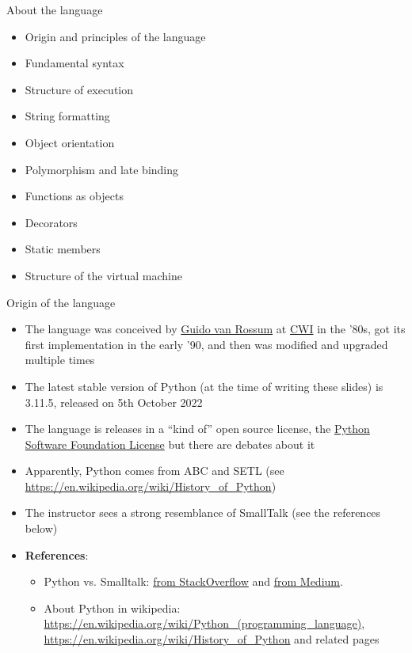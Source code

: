 \documentclass{beamer}
\begin{document}
\begin{frame}
{\centerline{About the language}}
\begin{itemize}
    \item Origin and principles of the language
    \item Fundamental syntax
    \item Structure of execution
    \item String formatting
    \item Object orientation
    \item Polymorphism and late binding
    \item Functions as objects
    \item Decorators
    \item Static members
    \item Structure of the virtual machine
\end{itemize} 
\end{frame}

\begin{frame}
{\centerline{Origin of the language}}
\begin{itemize}
    \item The language was conceived by  \href{https://en.wikipedia.org/wiki/Guido_van_Rossum}{Guido van Rossum} at  \href{https://en.wikipedia.org/wiki/Centrum_Wiskunde_\%26_Informatica}{CWI} in the '80s, got its first implementation in the early '90, and then was modified and upgraded multiple times
    \item The latest stable version of Python (at the time of writing these slides) is 3.11.5, released on 5th October 2022
    \item The language is releases in a ``kind of'' open source license, the \href{https://en.wikipedia.org/wiki/Python_Software_Foundation_License}{Python Software Foundation License} but there are debates about it
        \item Apparently, Python comes from ABC and SETL (see \url{https://en.wikipedia.org/wiki/History_of_Python})
    \item The instructor sees a strong resemblance of SmallTalk (see the references below)
\end{itemize} 

{\tiny
{}
\begin{itemize}
\item \textbf{References}:
\begin{itemize}
\item Python vs. Smalltalk: \href{https://stackoverflow.com/questions/1269242/differences-between-smalltalk-and-python}{from StackOverflow} and \href{https://medium.com/smalltalk-talk/why-choose-smalltalk-over-python-for-startups-21aefeafb83e}{from Medium}.
\item About Python in wikipedia: \url{https://en.wikipedia.org/wiki/Python_(programming_language)},  \url{https://en.wikipedia.org/wiki/History_of_Python} and related pages
\end{itemize}
\end{itemize}
}
\end{frame}
\end{document}

